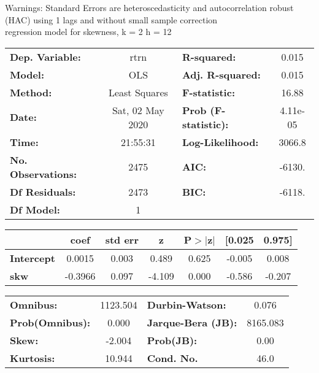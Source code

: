 Warnings: \newline
 [1] Standard Errors are heteroscedasticity and autocorrelation robust (HAC) using 1 lags and without small sample correction\\ 

regression model for skewness, k = 2 h = 12\begin{center}
\begin{tabular}{lclc}
\toprule
\textbf{Dep. Variable:}    &       rtrn       & \textbf{  R-squared:         } &     0.015   \\
\textbf{Model:}            &       OLS        & \textbf{  Adj. R-squared:    } &     0.015   \\
\textbf{Method:}           &  Least Squares   & \textbf{  F-statistic:       } &     16.88   \\
\textbf{Date:}             & Sat, 02 May 2020 & \textbf{  Prob (F-statistic):} &  4.11e-05   \\
\textbf{Time:}             &     21:55:31     & \textbf{  Log-Likelihood:    } &    3066.8   \\
\textbf{No. Observations:} &        2475      & \textbf{  AIC:               } &    -6130.   \\
\textbf{Df Residuals:}     &        2473      & \textbf{  BIC:               } &    -6118.   \\
\textbf{Df Model:}         &           1      & \textbf{                     } &             \\
\bottomrule
\end{tabular}
\begin{tabular}{lcccccc}
                   & \textbf{coef} & \textbf{std err} & \textbf{z} & \textbf{P$> |$z$|$} & \textbf{[0.025} & \textbf{0.975]}  \\
\midrule
\textbf{Intercept} &       0.0015  &        0.003     &     0.489  &         0.625        &       -0.005    &        0.008     \\
\textbf{skw}       &      -0.3966  &        0.097     &    -4.109  &         0.000        &       -0.586    &       -0.207     \\
\bottomrule
\end{tabular}
\begin{tabular}{lclc}
\textbf{Omnibus:}       & 1123.504 & \textbf{  Durbin-Watson:     } &    0.076  \\
\textbf{Prob(Omnibus):} &   0.000  & \textbf{  Jarque-Bera (JB):  } & 8165.083  \\
\textbf{Skew:}          &  -2.004  & \textbf{  Prob(JB):          } &     0.00  \\
\textbf{Kurtosis:}      &  10.944  & \textbf{  Cond. No.          } &     46.0  \\
\bottomrule
\end{tabular}
\end{center}

